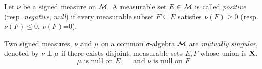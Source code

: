 \documentclass[../../main.tex]{subfiles}
\begin{document}
\begin{definition}
    Let $\nu$ be a signed measure on $\mathcal{M}$. A measurable set $E\in\mathcal{M}$ is called \emph{positive} (resp. \emph{negative}, \emph{null}) if every measurable subset $F\subseteq E$ satisfies $\nu(F)\geq 0$ (resp. $\nu(F)\leq 0$, $\nu(F)$=0).
\end{definition}


\begin{definition}
    Two signed measures, $\nu$ and $\mu$ on a common $\sigma$-algebra $\mathcal{M}$ are \emph{mutually singular}, denoted by $\nu\perp\mu$ if there exists disjoint, measurable sets $E,F$ whose union is ${\mathbf{X}}$.
    \[
        \mu \text{ is null on }E,\quad\text{ and }\nu \text{ is null on }F
    \]
\end{definition}
\end{document}
